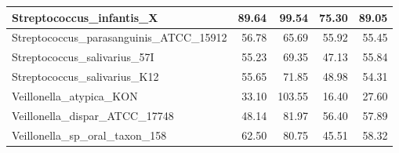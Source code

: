 \documentclass[12pt,a4paper]{article}
\begin{document}
\begin{table}[ht]
\begin{center}
\begin{tabular}{|l*{4}{|r}|}
Streptococcus\_infantis\_X & 89.64 & 99.54 & 75.30 & 89.05 \\ \hline
Streptococcus\_parasanguinis\_ATCC\_15912 & 56.78 & 65.69 & 55.92 & 55.45 \\ \hline
Streptococcus\_salivarius\_57I & 55.23 & 69.35 & 47.13 & 55.84 \\ \hline
Streptococcus\_salivarius\_K12 & 55.65 & 71.85 & 48.98 & 54.31 \\ \hline
Veillonella\_atypica\_KON & 33.10 & 103.55 & 16.40 & 27.60 \\ \hline
Veillonella\_dispar\_ATCC\_17748 & 48.14 & 81.97 & 56.40 & 57.89 \\ \hline
Veillonella\_sp\_oral\_taxon\_158 & 62.50 & 80.75 & 45.51 & 58.32 \\ \hline
\end{tabular}
\end{center}
\end{table}
\end{document}
